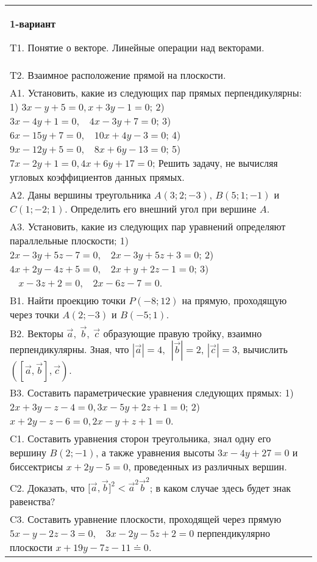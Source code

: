\documentclass{article}
\begin{document}


\begin{tabular}{m{17cm}}
\textbf{1-вариант}
\newline

T1. 
Понятие о векторе. Линейные операции над векторами.
 \\
T2. 
Взаимное расположение прямой на плоскости.
 \\
A1. 
Установить, какие из следующих пар прямых перпендикулярны: 1) \(3x - y + 5 = 0,x + 3y - 1 = 0\); 2) \(3x - 4y + 1 = 0,\ \ \ \ 4x - 3y + 7 = 0\); 3) \(6x - 15y + 7 = 0,\ \ \ \ 10x + 4y - 3 = 0\); 4) \(9x - 12y + 5 = 0,\ \ \ \ 8x + 6y - 13 = 0\); 5) \(7x - 2y + 1 = 0,4x + 6y + 17 = 0\); Решить задачу, не вычисляя угловых коэффициентов данных прямых.
 \\
A2. 
Даны вершины треугольника \(A(3;2; - 3)\), \(B(5;1; - 1)\) и \(C(1; - 2;1)\). Определить его внешний угол при вершине \(A\).
 \\
A3. 
Установить, какие из следующих пар уравнений определяют параллельные плоскости; 1) \(2x - 3y + 5z - 7 = 0,\ \ \ \ 2x - 3y + 5z + 3 = 0\); 2) \(4x + 2y - 4z + 5 = 0,\ \ \ \ 2x + y + 2z - 1 = 0\); 3) \(\ \ \ \ x - 3z + 2 = 0,\ \ \ \ 2x - 6z - 7 = 0\).
 \\
B1. 
Найти проекцию точки \(P( - 8;12)\) на прямую, проходящую через точки \(A(2; - 3)\) и \(B( - 5;1)\).
 \\
B2. 
Векторы \(\overrightarrow{a},\ \overrightarrow{b},\ \overrightarrow{c}\) образующие правую тройку, взаимно перпендикулярны. Зная, что \(|\overrightarrow{a}| = 4,\ \ |\overrightarrow{b}| = 2\), \(|\overrightarrow{c}| = 3\), вычислить \(\left( \left\lbrack \overrightarrow{a},\overrightarrow{b} \right\rbrack,\overrightarrow{c} \right)\).
 \\
B3. 
Составить параметрические уравнения следующих прямых: 1) \(2x + 3y - z - 4 = 0,3x - 5y + 2z + 1 = 0\); 2) \(x + 2y - z - 6 = 0,2x - y + z + 1 = 0\).
 \\
C1. 
Составить уравнения сторон треугольника, знал одну его вершину \(B(2; - 1)\), а также уравнения высоты \(3x - 4y + 27 = 0\) и биссектрисы \(x + 2y - 5 = 0\), проведенных из различных вершин.
 \\
C2. 
Доказать, что \(\lbrack\overrightarrow{a},\overrightarrow{b}\rbrack^{2} <  {\overrightarrow{a}}^{2}{\overrightarrow{b}}^{2}\); в каком случае здесь будет знак равенства?
 \\
C3. 
Составить уравнение плоскости, проходящей через прямую \(5x - y - 2z - 3 = 0,\ \ \ \ 3x - 2y - 5z + 2 = 0\) перпендикулярно плоскости \(x + 19y - 7z - 11 \doteq 0\).
 \\

\end{tabular}
\vspace{1cm}
\end{document}
